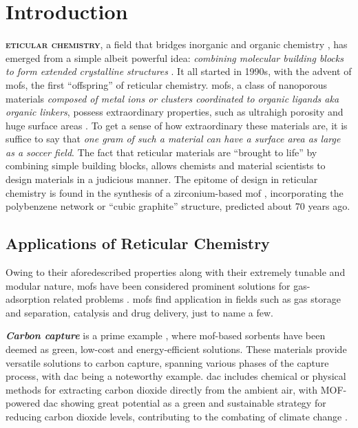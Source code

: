 \chapter{Introduction}

\lettrine[
	nindent=0em, findent=0.5em, loversize=-0.12, lines=5
]{}{\bfseries\color{Blue}eticular chemistry}, a field that bridges inorganic and
organic chemistry \parencite{Yaghi2020}, has emerged from a simple albeit
powerful idea: \emph{combining molecular building blocks to form extended
crystalline structures} \parencite{yaghi}. It all started in 1990s, with the
advent of \glspl{mof}, the first ``offspring''
of reticular chemistry. \glspl{mof}, a class of nanoporous materials
\emph{composed of metal ions or clusters
coordinated to organic ligands aka organic
linkers}, possess extraordinary properties, such as
ultrahigh porosity and huge surface areas \parencite{Farha_2012}. To get a sense
of how extraordinary these materials are, it is suffice to say that \emph{one
gram of such a material can have a surface area as large as a soccer field}.
The fact that reticular materials are ``brought to life'' by combining
simple building blocks, allows chemists and material scientists to design materials
in a judicious manner. The epitome of design in reticular chemistry is found in
the synthesis of a zirconium-based \gls{mof} \parencite{Alezi2016},
incorporating the polybenzene network or ``cubic graphite'' structure, predicted
about 70 years ago.

\section{Applications of Reticular Chemistry}

Owing to their aforedescribed properties along with their extremely tunable and
modular nature, \glspl{mof} have been considered prominent solutions for
gas-adsorption related problems \parencite{Li2007, Jiang2022}.  \glspl{mof} find
application in fields such as gas storage and
separation, catalysis and drug
delivery, just to name a few.

\emph{\bfseries Carbon capture} is a prime example
\parencite{An_2009, Sumida2011, Qazvini2021}, where \gls{mof}-based sorbents
have been deemed as green, low-cost and energy-efficient solutions. These
materials provide versatile solutions to carbon capture, spanning various phases
of the capture process, with \gls{dac} being a
noteworthy example.  \gls{dac} includes chemical or physical methods for
extracting carbon dioxide directly from the ambient air, with MOF-powered
\gls{dac} showing great potential as a green and sustainable strategy for
reducing carbon dioxide levels, contributing to the combating of climate change
\parencite{Bose2023}.

